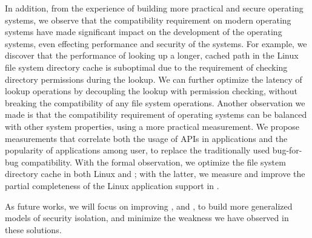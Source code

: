 In addition, from the experience of building more practical and secure operating systems,
we observe that the compatibility requirement on modern operating systems have made significant impact
on the development of the operating systems,
even effecting performance and security of the systems.
For example, we discover that the performance of looking up a longer, cached path in the Linux file system directory cache
is suboptimal due to the requirement of checking directory permissions during the lookup.
We can further optimize the latency of lookup operations
by decoupling the lookup with permission checking,
without breaking the compatibility of any file system operations.
Another observation we made is that
the compatibility requirement of operating systems can be balanced with other system properties,
using a more practical measurement.
We propose measurements that correlate both the usage of APIs in applications
and the popularity of applications among user,
to replace the traditionally used bug-for-bug compatibility.
With the formal observation, we optimize the file system directory cache in both Linux and \graphene{};
with the latter, we measure and improve the partial completeness of the Linux application support in \graphene{}. 

As future works, we will focus on improving \graphene{}, \gsgx{} and \civet{},
to build more generalized models of security isolation, and minimize the weakness we have observed in these solutions.
